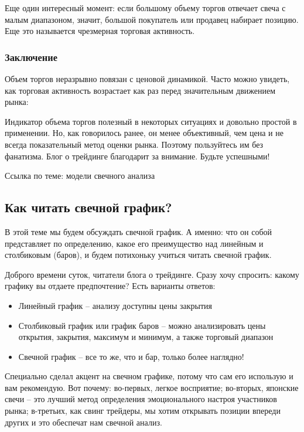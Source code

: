 \documentclass{book}
\begin{document}
Еще один интересный момент: если большому объему торгов отвечает свеча с малым диапазоном, значит, большой покупатель или продавец набирает позицию. Еще это называется чрезмерная торговая активность.

\subsubsection{Заключение}

Объем торгов неразрывно повязан с ценовой динамикой. Часто можно увидеть, как торговая активность возрастает как раз перед значительным движением рынка:

Индикатор объема торгов полезный в некоторых ситуациях и довольно простой в применении. Но, как говорилось ранее, он менее объективный, чем цена и не всегда показательный метод оценки рынка. Поэтому пользуйтесь им без фанатизма. Блог о трейдинге благодарит за внимание. Будьте успешными!


Ссылка по теме: модели свечного анализа

\subsection{Как читать свечной график?}

В этой теме мы будем обсуждать свечной график. А именно: что он собой представляет по определению, какое его преимущество над линейным и столбиковым (баров), и будем потихоньку учиться читать свечной график.

Доброго времени суток, читатели блога о трейдинге. Сразу хочу спросить: какому графику вы отдаете предпочтение? Есть варианты ответов:
\begin{itemize}
\item     Линейный график – анализу доступны цены закрытия
\item     Столбиковый график или график баров – можно анализировать цены открытия, закрытия, максимум и минимум, а также торговый диапазон
\item     Свечной график – все то же, что и бар, только более наглядно!
\end{itemize}

Специально сделал акцент на свечном графике, потому что сам его использую и вам рекомендую. Вот почему: во-первых, легкое восприятие; во-вторых, японские свечи – это лучший метод определения эмоционального настроя участников рынка; в-третьих, как свинг трейдеры, мы хотим открывать позиции впереди других и это обеспечат нам свечной анализ.
\end{document}
